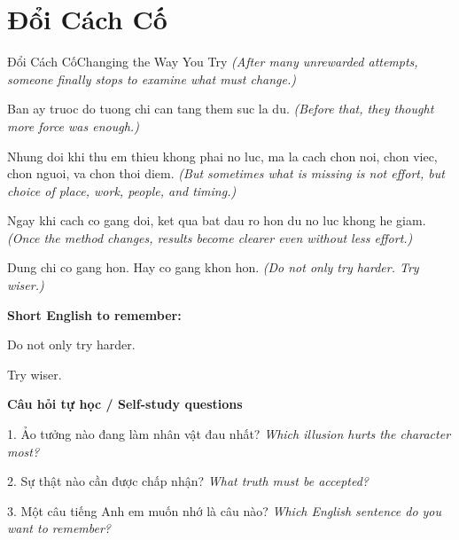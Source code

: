 \section{Đổi Cách Cố}
\begin{truyen}{Đổi Cách Cố}{Changing the Way You Try}
\textit{(After many unrewarded attempts, someone finally stops to examine what must change.)}

Ban ay truoc do tuong chi can tang them suc la du.
\textit{(Before that, they thought more force was enough.)}

Nhung doi khi thu em thieu khong phai no luc, ma la cach chon noi, chon viec, chon nguoi, va chon thoi diem.
\textit{(But sometimes what is missing is not effort, but choice of place, work, people, and timing.)}

Ngay khi cach co gang doi, ket qua bat dau ro hon du no luc khong he giam.
\textit{(Once the method changes, results become clearer even without less effort.)}

\end{truyen}

\begin{baihoc}
Dung chi co gang hon. Hay co gang khon hon.
\textit{(Do not only try harder. Try wiser.)}
\end{baihoc}

\begin{ghinhoanh}
\textbf{Short English to remember:}

Do not only try harder.

Try wiser.

\end{ghinhoanh}

\begin{tuhocnhanh}
\textbf{Câu hỏi tự học / Self-study questions}

1. Ảo tưởng nào đang làm nhân vật đau nhất? \textit{Which illusion hurts the character most?}

2. Sự thật nào cần được chấp nhận? \textit{What truth must be accepted?}

3. Một câu tiếng Anh em muốn nhớ là câu nào? \textit{Which English sentence do you want to remember?}
\end{tuhocnhanh}
